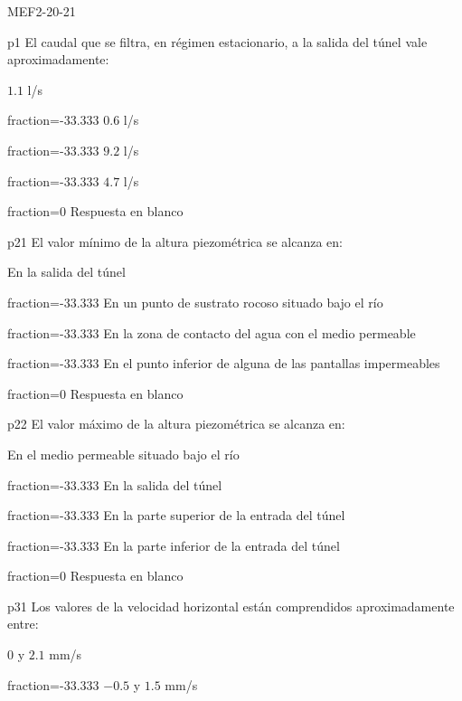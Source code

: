 \documentclass[a4paper]{article}
\begin{document}
	
\begin{quiz}{MEF2-20-21}

\begin{multi}{p1}
El caudal que se filtra, en r\'egimen estacionario, a la salida del t\'unel vale
aproximadamente:
\item* $1.1$ l/s
\item[fraction=-33.333] $0.6$ l/s
\item[fraction=-33.333] $9.2$ l/s
\item[fraction=-33.333] $4.7$ l/s
\item[fraction=0] Respuesta en blanco
\end{multi}
\begin{multi}{p21}
El valor m\'inimo de la altura piezom\'etrica se alcanza en:
	\item* En la salida del t\'unel
\item[fraction=-33.333] En un punto de sustrato rocoso situado bajo el r\'io
\item[fraction=-33.333] En la zona de contacto del agua con el medio permeable
\item[fraction=-33.333] En el punto inferior de alguna de las pantallas
impermeables
\item[fraction=0] Respuesta en blanco
\end{multi}
\begin{multi}{p22}
El valor m\'aximo de la altura piezom\'etrica se alcanza en:
\item* En el medio permeable situado bajo el r\'io
\item[fraction=-33.333] En la salida del t\'unel
\item[fraction=-33.333] En la parte superior de la entrada del t\'unel
\item[fraction=-33.333] En la parte inferior de la entrada del t\'unel
\item[fraction=0] Respuesta en blanco
\end{multi}
\begin{multi}{p31}
Los valores de la velocidad horizontal est\'an
comprendidos aproximadamente entre:
\item* $0$ y $2.1$ mm/s
\item[fraction=-33.333] $-0.5$ y $1.5$ mm/s

\end{multi}
\end{quiz}
\end{document}
